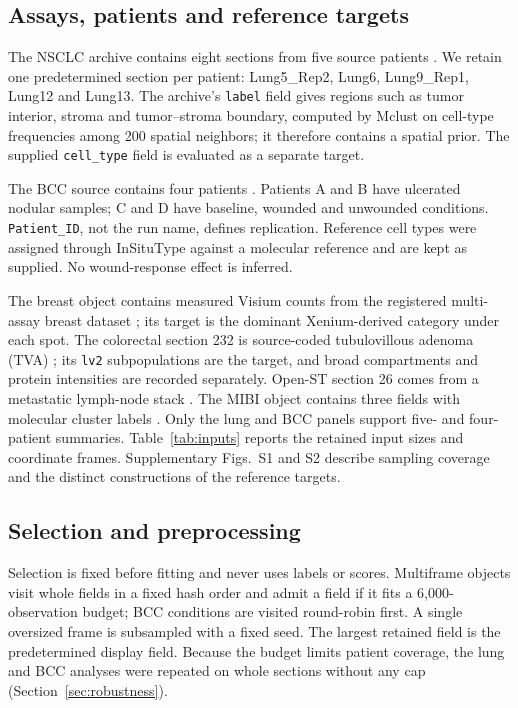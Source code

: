 \documentclass[11pt]{article}
\begin{document}
\subsection{Assays, patients and reference targets}
The NSCLC archive contains eight sections from five source patients \citep{he2022cosmx,sun2026consensus}. We retain one predetermined section per patient: Lung5\_Rep2, Lung6, Lung9\_Rep1, Lung12 and Lung13. The archive's \texttt{label} field gives regions such as tumor interior, stroma and tumor--stroma boundary, computed by Mclust on cell-type frequencies among 200 spatial neighbors; it therefore contains a spatial prior. The supplied \texttt{cell\_type} field is evaluated as a separate target.

The BCC source contains four patients \citep{yerly2024wound}. Patients A and B have ulcerated nodular samples; C and D have baseline, wounded and unwounded conditions. \texttt{Patient\_ID}, not the run name, defines replication. Reference cell types were assigned through InSituType against a molecular reference and are kept as supplied. No wound-response effect is inferred.

The breast object contains measured Visium counts from the registered multi-assay breast dataset \citep{janesick2023breast}; its target is the dominant Xenium-derived category under each spot. The colorectal section 232 is source-coded tubulovillous adenoma (TVA) \citep{crowell2025tva}; its \texttt{lv2} subpopulations are the target, and broad compartments and protein intensities are recorded separately. Open-ST section 26 comes from a metastatic lymph-node stack \citep{schott2024openst}. The MIBI object contains three fields with molecular cluster labels \citep{hartmann2021scmep,palla2022squidpy}. Only the lung and BCC panels support five- and four-patient summaries. Table~\ref{tab:inputs} reports the retained input sizes and coordinate frames. Supplementary Figs.~S1 and S2 describe sampling coverage and the distinct constructions of the reference targets.



\subsection{Selection and preprocessing}
Selection is fixed before fitting and never uses labels or scores. Multiframe objects visit whole fields in a fixed hash order and admit a field if it fits a 6,000-observation budget; BCC conditions are visited round-robin first. A single oversized frame is subsampled with a fixed seed. The largest retained field is the predetermined display field. Because the budget limits patient coverage, the lung and BCC analyses were repeated on whole sections without any cap (Section~\ref{sec:robustness}).
\end{document}
